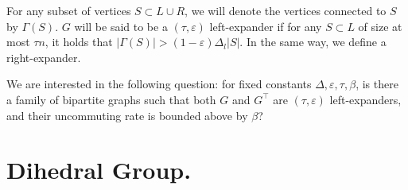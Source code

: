 \documentclass[manuscript,screen,review]{acmart}
\begin{document}
For any subset of vertices $S \subset L \cup R$, we will denote the vertices connected to $S$ by $\Gamma(S)$. $G$ will be said to be a $(\tau, \varepsilon)$ left-expander if for any $S \subset L$ of size at most $\tau n$, it holds that $|\Gamma(S)| > (1-\varepsilon)\Delta_{l}|S|$. In the same way, we define a right-expander.

We are interested in the following question: for fixed constants $\Delta, \varepsilon, \tau, \beta$, is there a family of bipartite graphs such that both $G$ and $G^{\top}$ are $(\tau,\varepsilon)$ left-expanders, and their uncommuting rate is bounded above by $\beta$?





\section{Dihedral Group.}
\end{document}
